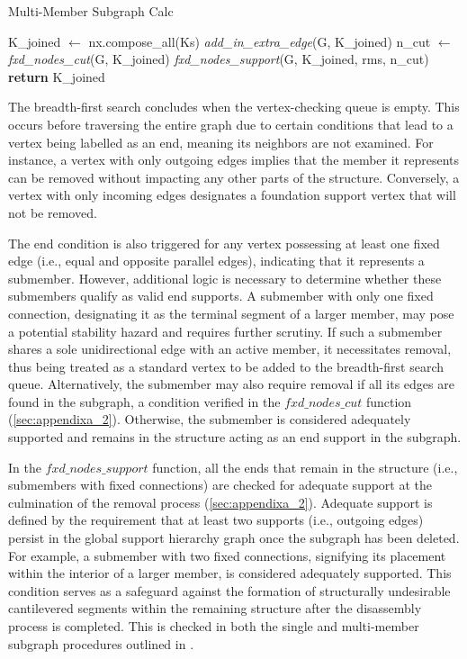         \begin{algorithm}
            \caption{Multi-Member Subgraph Calc}
            \label{alg:alg2_multi}
            \begin{algorithmic}[1]
                \State K\_joined $\gets$ nx.compose\_all(Ks)
                \State \textit{add\_in\_extra\_edge}(G, K\_joined)
                \State n\_cut $\gets$ \textit{fxd\_nodes\_cut}(G, K\_joined)
                \State \textit{fxd\_nodes\_support}(G, K\_joined, rms, n\_cut)
                \State \textbf{return} K\_joined
            \EndProcedure
            \end{algorithmic}
        \end{algorithm}

        The breadth-first search concludes when the vertex-checking queue is empty. This occurs before traversing the entire graph due to certain conditions that lead to a vertex being labelled as an end, meaning its neighbors are not examined. For instance, a vertex with only outgoing edges implies that the member it represents can be removed without impacting any other parts of the structure. Conversely, a vertex with only incoming edges designates a foundation support vertex that will not be removed.
        
        The end condition is also triggered for any vertex possessing at least one fixed edge (i.e., equal and opposite parallel edges), indicating that it represents a submember. However, additional logic is necessary to determine whether these submembers qualify as valid end supports. A submember with only one fixed connection, designating it as the terminal segment of a larger member, may pose a potential stability hazard and requires further scrutiny. If such a submember shares a sole unidirectional edge with an active member, it necessitates removal, thus being treated as a standard vertex to be added to the breadth-first search queue. Alternatively, the submember may also require removal if all its edges are found in the subgraph, a condition verified in the $fxd\_nodes\_cut$ function (\cref{sec:appendixa_2}). Otherwise, the submember is considered adequately supported and remains in the structure acting as an end support in the subgraph.

        In the $fxd\_nodes\_support$ function, all the ends that remain in the structure (i.e., submembers with fixed connections) are checked for adequate support at the culmination of the removal process (\cref{sec:appendixa_2}). Adequate support is defined by the requirement that at least two supports (i.e., outgoing edges) persist in the global support hierarchy graph once the subgraph has been deleted. For example, a submember with two fixed connections, signifying its placement within the interior of a larger member, is considered adequately supported. This condition serves as a safeguard against the formation of structurally undesirable cantilevered segments within the remaining structure after the disassembly process is completed. This is checked in both the single and multi-member subgraph procedures outlined in .

